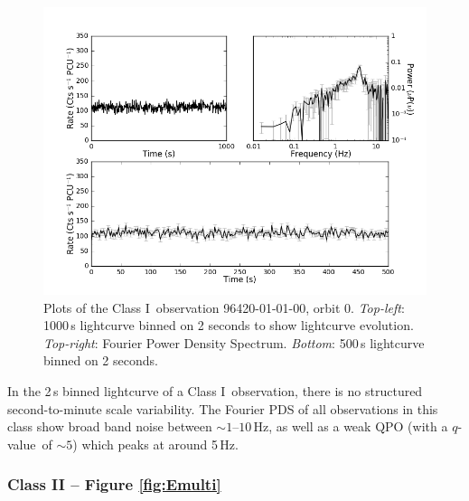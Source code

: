 \begin{figure}
    \includegraphics[width=0.8\columnwidth, trim = 0.6cm 0 3.9cm 0]{images/Bmulti.png}
    \captionsetup{singlelinecheck=off}
    \caption[Characteristic lightcurves and a power spectrum of Type I variability.]{Plots of the Class I\indexi\ observation 96420-01-01-00, orbit 0.  \textit{Top-left}: 1000\,s lightcurve binned on 2 seconds to show lightcurve evolution.  \textit{Top-right}: Fourier Power Density Spectrum.  \textit{Bottom}: 500\,s lightcurve binned on 2 seconds.}
   \label{fig:Bmulti}
\end{figure}

In the 2\,s binned lightcurve of a Class I\indexi\ observation, there is no structured second-to-minute scale variability.  The Fourier PDS of all observations in this class show broad band noise between $\sim1$--$10$\,Hz, as well as a weak QPO (with a $q$-value\indexq\ of $\sim5$) which peaks at around 5\,Hz.

\subsubsection{Class II -- Figure \ref{fig:Emulti}}

